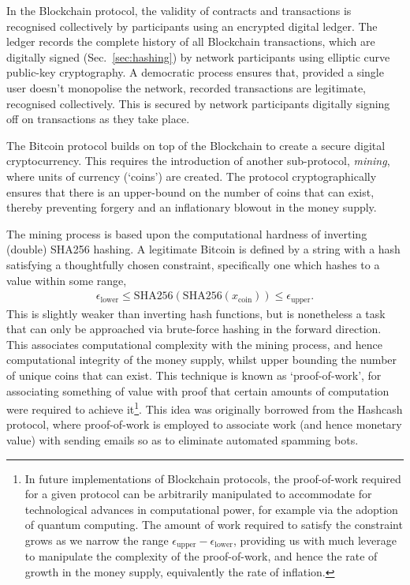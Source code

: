 In the Blockchain protocol, the validity of contracts and transactions is recognised collectively by participants using an encrypted digital ledger. The ledger records the complete history of all Blockchain transactions, which are digitally signed (Sec.~\ref{sec:hashing}) by network participants using elliptic curve public-key cryptography. A democratic process ensures that, provided a single user doesn't monopolise the network, recorded transactions are legitimate, recognised collectively. This is secured by network participants digitally signing off on transactions as they take place.

The Bitcoin protocol builds on top of the Blockchain to create a secure digital cryptocurrency. This requires the introduction of another sub-protocol, \textit{mining}, where units of currency (`coins') are created. The protocol cryptographically ensures that there is an upper-bound on the number of coins that can exist, thereby preventing forgery and an inflationary blowout in the money supply.

The mining process is based upon the computational hardness of inverting (double) SHA256 hashing. A legitimate Bitcoin is defined by a string with a hash satisfying a thoughtfully chosen constraint, specifically one which hashes to a value within some range,
\begin{align}
	\epsilon_\mathrm{lower}\leq \mathrm{SHA256}(\mathrm{SHA256}(x_\mathrm{coin})) \leq \epsilon_\mathrm{upper}.
\end{align}
This is slightly weaker than inverting hash functions, but is nonetheless a task that can only be approached via brute-force hashing in the forward direction. This associates computational complexity with the mining process, and hence computational integrity of the money supply, whilst upper bounding the number of unique coins that can exist. This technique is known as `proof-of-work', for associating something of value with proof that certain amounts of computation were required to achieve it\footnote{In future implementations of Blockchain protocols, the proof-of-work required for a given protocol can be arbitrarily manipulated to accommodate for technological advances in computational power, for example via the adoption of quantum computing. The amount of work required to satisfy the constraint grows as we narrow the range \mbox{$\epsilon_\mathrm{upper}-\epsilon_\mathrm{lower}$}, providing us with much leverage to manipulate the complexity of the proof-of-work, and hence the rate of growth in the money supply, equivalently the rate of inflation.}. This idea was originally borrowed from the Hashcash protocol, where proof-of-work is employed to associate work (and hence monetary value) with sending emails so as to eliminate automated spamming bots.


